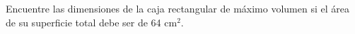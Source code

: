 \item Encuentre las dimensiones de la caja rectangular de máximo volumen si el área de su superficie total debe ser de 64 $\text{cm}^2$.
